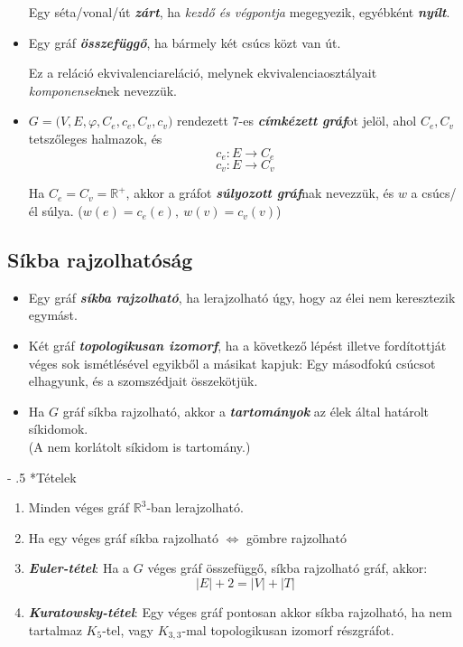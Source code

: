 \documentclass[12pt,margin=0px]{article}
\makeatletter
\newcommand{\R}{\mathbb{R}}
\renewcommand\paragraph{%
	\@startsection{paragraph}{4}{0mm}%
	{-\baselineskip}%
	{.5\baselineskip}%
	{\normalfont\normalsize\bfseries}}
\makeatother
\begin{document}
\begin{itemize}[leftmargin=5.5mm]
            Egy séta/vonal/út \emph{\textbf{zárt}}, ha \emph{kezdő és végpontja} megegyezik, egyébként \emph{\textbf{nyílt}}.
            \item Egy gráf \emph{\textbf{összefüggő}}, ha bármely két csúcs közt van út.

            Ez a reláció ekvivalenciareláció, melynek ekvivalenciaosztályait \emph{komponensek}nek nevezzük.
            \item $G=\big(V,E,\varphi, C_e, c_e, C_v,c_v\big)$ rendezett 7-es \emph{\textbf{címkézett gráf}}ot jelöl, ahol $C_e, C_v$ tetszőleges halmazok, és
            \[c_e:E\rightarrow C_e\]
            \[c_v:E\rightarrow C_v\]

            Ha $C_e = C_v = \R^+$, akkor a gráfot \emph{\textbf{súlyozott gráf}}nak nevezzük, és $w$ a csúcs/él súlya. \big(${w(e)=c_e(e)},\ {w(v) = c_v(v)}$\big)
        \end{itemize}

	\subsection*{Síkba rajzolhatóság}

    \begin{itemize}[leftmargin=5.5mm]
        \renewcommand{\labelitemi}{$\vcenter{\hbox{\tiny$\bullet$}}$}
        \item Egy gráf \emph{\textbf{síkba rajzolható}}, ha lerajzolható úgy, hogy az élei nem keresztezik egymást.
        \item Két gráf \emph{\textbf{topologikusan izomorf}}, ha a következő lépést illetve fordítottját véges sok ismétlésével egyikből a másikat kapjuk: Egy másodfokú csúcsot elhagyunk, és a szomszédjait összekötjük.
        \item Ha $G$ gráf síkba rajzolható, akkor a \emph{\textbf{tartományok}} az élek által határolt síkidomok. \\
        (A nem korlátolt síkidom is tartomány.)
	\end{itemize}

	\paragraph*{Tételek\\}
	\begin{enumerate}[leftmargin=7.5mm]
        \item Minden véges gráf $\R^3$-ban lerajzolható.
        \item Ha egy véges gráf síkba rajzolható $\Longleftrightarrow$ gömbre rajzolható
        \item \emph{\textbf{Euler-tétel}}: Ha a $G$ véges gráf összefüggő, síkba rajzolható gráf, akkor:
		\[
            \big|E\big|+2 = \big|V\big|+\big|T\big|
        \]
		\item \emph{\textbf{Kuratowsky-tétel}}: Egy véges gráf pontosan akkor síkba rajzolható, ha nem tartalmaz $K_5$-tel, vagy $K_{3,3}$-mal topologikusan izomorf részgráfot.
	\end{enumerate}
\end{document}
